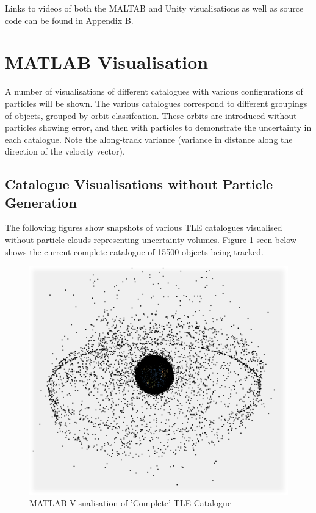 \documentclass[12pt,openany,a4paper]{book}
\begin{document}
	Links to videos of both the MALTAB and Unity visualisations as well as source code can be found in Appendix B.
	
		\section{MATLAB Visualisation}
		
		A number of visualisations of different catalogues with various configurations of particles will be shown. The various catalogues correspond to different groupings of objects, grouped by orbit classifcation. These orbits are introduced without particles showing error, and then with particles to demonstrate the uncertainty in each catalogue. Note the along-track variance (variance in distance along the direction of the velocity vector). 
		
		\subsection{Catalogue Visualisations without Particle Generation}
		
		The following figures show snapshots of various TLE catalogues visualised without particle clouds representing uncertainty volumes. Figure \ref{cata2} seen below shows the current complete catalogue of 15500 objects being tracked.
		

			\begin{figure}[H]
				\centering
				\caption{MATLAB Visualisation of 'Complete' TLE Catalogue}
				\label{cata2}
				\includegraphics[scale=0.5]{cata2.png}
			\end{figure}
			
\end{document}
